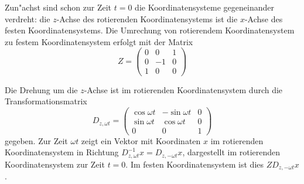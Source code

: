 \begin{loesung}
Zun"achst sind schon zur Zeit $t=0$ die Koordinatensysteme gegeneinander
verdreht: die $z$-Achse des rotierenden Koordinatensystems ist die 
$x$-Achse des festen Koordinatensystems.
Die Umrechung von rotierendem Koordinatensystem zu festem Koordinatensystem
erfolgt mit der Matrix
\[
Z
=
\begin{pmatrix}
0& 0&1\\
0&-1&0\\
1& 0&0
\end{pmatrix}
\]

Die Drehung um die $z$-Achse ist im rotierenden Koordinatensystem
durch die Transformationsmatrix
\[
D_{z,\omega t}
=
\begin{pmatrix}
\cos\omega t &-\sin\omega t & 0\\
\sin\omega t & \cos\omega t & 0\\
     0       &     0        & 1
\end{pmatrix}
\]
gegeben.
Zur Zeit $\omega t$ zeigt ein Vektor mit Koordinaten $x$ im rotierenden
Koordinatensystem in Richtung $D_{z,\omega t}^{-1}x=D_{z,-\omega t}x$,
dargestellt im rotierenden Koordinatensystem zur Zeit $t=0$.
Im festen Koordinatensystem ist dies $ZD_{z,-\omega t}x$.


\end{loesung}
